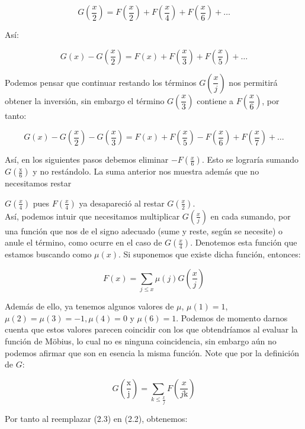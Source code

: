 $$G \left( \frac{x}{2} \right)=F \left( \dfrac{x}{2} \right)+F \left( \frac{x}{4} \right)+F \left( \frac{x}{6} \right)+\ldots$$

Así:

$$G(x)-G \left( \frac{x}{2} \right)=F(x)+F \left( \dfrac{x}{3} \right)+F \left( \dfrac{x}{5} \right)+\ldots$$

Podemos pensar que continuar restando los términos $G \left( \dfrac{x}{j} \right)$ nos permitirá obtener la inversión, sin embargo el término $G \left( \dfrac{x}{3} \right)$ contiene a $F \left( \dfrac{x}{6} \right)$, por tanto:

$$
G(x)-G\left(\frac{x}{2}\right)-G\left(\frac{x}{3}\right)=F(x)+F\left(\frac{x}{5}\right)-F\left(\frac{x}{6}\right)+F\left(\frac{x}{7}\right)+\ldots
$$

Así, en los siguientes pasos debemos eliminar $-F\left(\frac{x}{6}\right)$. Esto se lograría sumando $G\left(\frac{\mathrm{x}}{6}\right)$ y no restándolo. La suma anterior nos muestra además que no necesitamos restar 

$G\left(\frac{x}{4}\right)$ pues $F\left(\frac{x}{4}\right)$ ya desapareció al restar $G\left(\frac{x}{2}\right)$.\\


Así, podemos intuir que necesitamos multiplicar $G(\frac{x}{j})$ en cada sumando, por una función que nos de el signo adecuado (sume y reste, según se necesite) o anule el término, como ocurre en el caso de $G\left(\frac{x}{4}\right)$. Denotemos esta función que estamos buscando como $\mu(x)$. Si suponemos que existe dicha función, entonces:

\begin{equation}
F(x)=\sum_{j \leqslant x} \mu(j) G\left(\frac{x}{j}\right)
\end{equation}

Además de ello, ya tenemos algunos valores de $\mu$, $\mu(1)=1$, $\mu(2)=\mu(3)=-1, \mu(4)=0$ y $\mu(6)=1$. Podemos de momento darnos cuenta que estos valores parecen coincidir con los que obtendríamos al evaluar la función de Möbius, lo cual no es ninguna coincidencia, sin embargo aún no podemos afirmar que son en esencia la misma función. Note que por la definición de $G$:

\begin{equation}
G\left(\frac{\mathrm{x}}{\mathrm{j}}\right)=\sum_{k\leq \frac{x}{j}} F\left(\frac{x}{j \mathrm{k}}\right)
\end{equation}

Por tanto al reemplazar (2.3) en (2.2), obtenemos:

